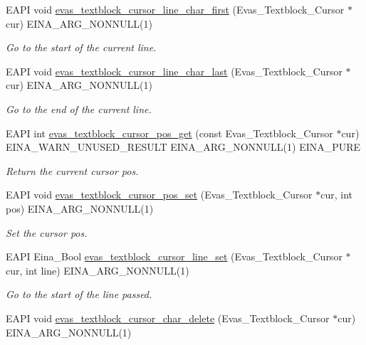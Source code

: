 \begin{DoxyCompactItemize}
EAPI void \hyperlink{group__Evas__Object__Textblock_ga6da9c7bff6073756a619f9b8a00d0e0b}{evas\_\-textblock\_\-cursor\_\-line\_\-char\_\-first} (Evas\_\-Textblock\_\-Cursor $\ast$cur) EINA\_\-ARG\_\-NONNULL(1)
\begin{DoxyCompactList}\small\item\em Go to the start of the current line. \item\end{DoxyCompactList}\item 
EAPI void \hyperlink{group__Evas__Object__Textblock_gaf96505739a5a805922f86b0e9c577afe}{evas\_\-textblock\_\-cursor\_\-line\_\-char\_\-last} (Evas\_\-Textblock\_\-Cursor $\ast$cur) EINA\_\-ARG\_\-NONNULL(1)
\begin{DoxyCompactList}\small\item\em Go to the end of the current line. \item\end{DoxyCompactList}\item 
EAPI int \hyperlink{group__Evas__Object__Textblock_ga7f74459b59870c258bd312ff114778bc}{evas\_\-textblock\_\-cursor\_\-pos\_\-get} (const Evas\_\-Textblock\_\-Cursor $\ast$cur) EINA\_\-WARN\_\-UNUSED\_\-RESULT EINA\_\-ARG\_\-NONNULL(1) EINA\_\-PURE
\begin{DoxyCompactList}\small\item\em Return the current cursor pos. \item\end{DoxyCompactList}\item 
EAPI void \hyperlink{group__Evas__Object__Textblock_gacde95e638bba6858b73f316afe2cfef0}{evas\_\-textblock\_\-cursor\_\-pos\_\-set} (Evas\_\-Textblock\_\-Cursor $\ast$cur, int pos) EINA\_\-ARG\_\-NONNULL(1)
\begin{DoxyCompactList}\small\item\em Set the cursor pos. \item\end{DoxyCompactList}\item 
EAPI Eina\_\-Bool \hyperlink{group__Evas__Object__Textblock_gaa1992968fd64630687b18a5f9d632edf}{evas\_\-textblock\_\-cursor\_\-line\_\-set} (Evas\_\-Textblock\_\-Cursor $\ast$cur, int line) EINA\_\-ARG\_\-NONNULL(1)
\begin{DoxyCompactList}\small\item\em Go to the start of the line passed. \item\end{DoxyCompactList}\item 
EAPI void \hyperlink{group__Evas__Object__Textblock_gaf9cd7ffa37008c0d6f61413703a0670e}{evas\_\-textblock\_\-cursor\_\-char\_\-delete} (Evas\_\-Textblock\_\-Cursor $\ast$cur) EINA\_\-ARG\_\-NONNULL(1)

\end{DoxyCompactItemize}

